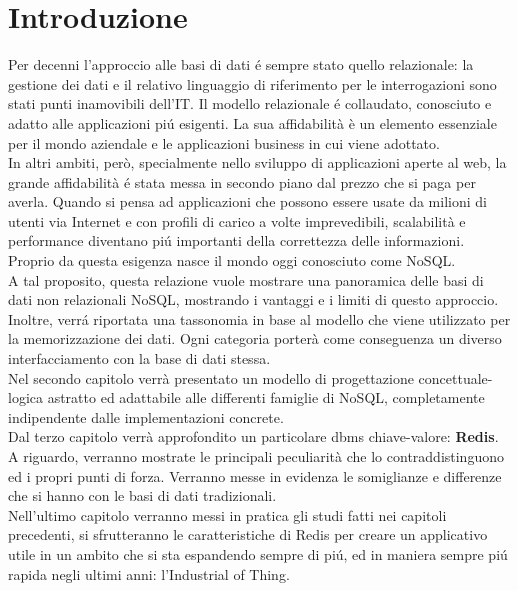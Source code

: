 \chapter*{Introduzione}
Per decenni l'approccio alle basi di dati é sempre stato quello relazionale: la gestione dei dati e il relativo
linguaggio di riferimento per le interrogazioni sono stati punti inamovibili dell'IT.
Il modello relazionale é collaudato, conosciuto e adatto alle applicazioni piú esigenti.
La sua affidabilità è un elemento essenziale per il mondo aziendale e le applicazioni business in cui viene adottato.\\
In altri ambiti, però, specialmente nello sviluppo di applicazioni aperte al web, la grande affidabilità é stata
messa in secondo piano dal prezzo che si paga per averla. Quando si pensa ad applicazioni che possono essere
usate da milioni di utenti via Internet e con profili di carico a volte imprevedibili, scalabilità e performance
diventano piú importanti della correttezza delle informazioni.
Proprio da questa esigenza nasce il mondo oggi conosciuto come NoSQL.\\
A tal proposito, questa relazione vuole mostrare una panoramica delle basi di dati non relazionali NoSQL,
mostrando i vantaggi e i limiti di questo approccio. Inoltre, verrá riportata
una tassonomia in base al modello che viene utilizzato per la memorizzazione dei dati.
Ogni categoria porterà come conseguenza un diverso interfacciamento
con la base di dati stessa.\\
Nel secondo capitolo verrà presentato un modello di progettazione concettuale-logica
astratto ed adattabile alle differenti famiglie di NoSQL, completamente indipendente dalle implementazioni concrete.\\
Dal terzo capitolo verrà approfondito un particolare dbms chiave-valore: \textbf{Redis}.\\
A riguardo, verranno mostrate le principali peculiarità che lo contraddistinguono ed i propri punti di forza.
Verranno messe in evidenza le somiglianze e differenze che si hanno con le basi di dati tradizionali.\\
Nell'ultimo capitolo verranno messi in pratica gli studi fatti nei capitoli precedenti, si sfrutteranno
le caratteristiche di Redis per creare un applicativo utile in un ambito che si sta espandendo sempre di piú, ed in maniera sempre piú rapida
negli ultimi anni: l'Industrial of Thing.

